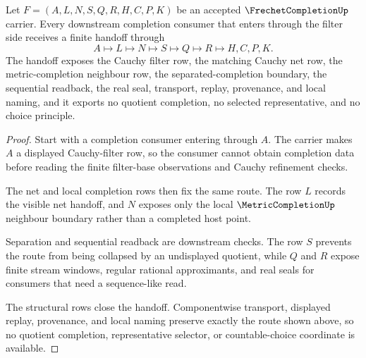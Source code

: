 \begin{theorem}\label{thm:frechet-completion-filter-handoff}
Let $F=(A,L,N,S,Q,R,H,C,P,K)$ be an accepted $\FrechetCompletionUp$ carrier. Every downstream completion consumer that enters through the filter side receives a finite handoff through
$$
A \longmapsto L \longmapsto N \longmapsto S \longmapsto Q \longmapsto R \longmapsto H,C,P,K .
$$
The handoff exposes the Cauchy filter row, the matching Cauchy net row, the metric-completion neighbour row, the separated-completion boundary, the sequential readback, the real seal, transport, replay, provenance, and local naming, and it exports no quotient completion, no selected representative, and no choice principle.
\end{theorem}
\begin{proof}
Start with a completion consumer entering through $A$. The carrier makes $A$ a displayed Cauchy-filter row, so the consumer cannot obtain completion data before reading the finite filter-base observations and Cauchy refinement checks.

The net and local completion rows then fix the same route. The row $L$ records the visible net handoff, and $N$ exposes only the local $\MetricCompletionUp$ neighbour boundary rather than a completed host point.

Separation and sequential readback are downstream checks. The row $S$ prevents the route from being collapsed by an undisplayed quotient, while $Q$ and $R$ expose finite stream windows, regular rational approximants, and real seals for consumers that need a sequence-like read.

The structural rows close the handoff. Componentwise transport, displayed replay, provenance, and local naming preserve exactly the route shown above, so no quotient completion, representative selector, or countable-choice coordinate is available.
\end{proof}

